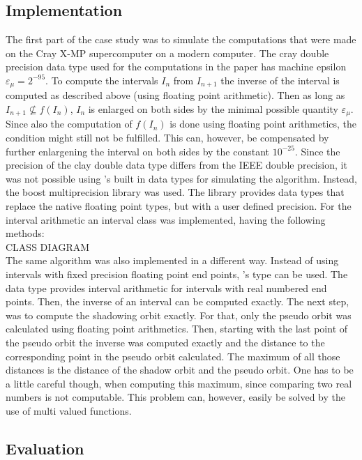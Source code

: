 \subsection{Implementation}
  The first part of the case study was to simulate the computations that were made on the Cray X-MP supercomputer on a modern computer. 
  The cray double precision data type used for the computations in the paper has machine epsilon $\varepsilon_\mu = 2^{-95}$.
  To compute the intervals $I_n$ from $I_{n+1}$ the inverse of the interval is computed as described above (using floating point arithmetic).
  Then as long as $I_{n+1} \not \subseteq f(I_n)$, $I_n$ is enlarged on both sides by the minimal possible quantity $\varepsilon_\mu$. 
  Since also the computation of $f(I_n)$ is done using floating point arithmetics, the condition might still not be fulfilled.
  This can, however, be compensated by further enlargening the interval on both sides by the constant $10^{-25}$.
  Since the precision of the clay double data type differs from the IEEE double precision, it was not possible using \cc's built in data types for simulating the algorithm.
  Instead, the boost multiprecision library \cite{boostmultiprecision} was used. 
  The library provides data types that replace the native \cc floating point types, but with a user defined precision. 
  For the interval arithmetic an interval class was implemented, having the following methods:\\
  CLASS DIAGRAM \\
  The same algorithm was also implemented in a different way. 
  Instead of using intervals with fixed precision floating point end points, \irram's  type can be used. 
  The data type provides interval arithmetic for intervals with real numbered end points.
  Then, the inverse of an interval can be computed exactly.
  The next step, was to compute the shadowing orbit exactly.
  For that, only the pseudo orbit was calculated using floating point arithmetics. 
  Then, starting with the last point of the pseudo orbit the inverse was computed exactly and the distance to the corresponding point in the pseudo orbit calculated.
  The maximum of all those distances is the distance of the shadow orbit and the pseudo orbit.
  One has to be a little careful though, when computing this maximum, since comparing two real numbers is not computable. 
  This problem can, however, easily be solved by the use of multi valued functions. 
\subsection{Evaluation}
